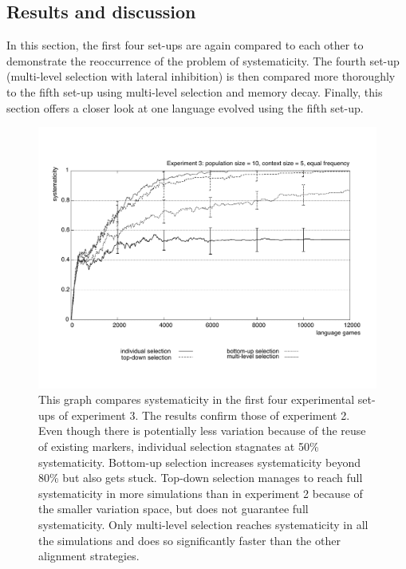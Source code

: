 \subsection{Results and discussion}

In this section, the first four set-ups are again compared to each other to demonstrate the reoccurrence of the problem of systematicity. The fourth set-up (multi-level selection with lateral inhibition) is then compared more thoroughly to the fifth set-up using multi-level selection and memory decay. Finally, this section offers a closer look at one language evolved using the fifth set-up.

\begin{figure}[t]
\centerline{\includegraphics[width=\textwidth]{Chapter4/figs/systematicity3}}
  \caption[Experiment 3: systematicity]{This graph compares systematicity in the first four experimental set-ups of experiment 3. The results confirm those of experiment 2. Even though there is potentially less variation because of the reuse of existing markers, individual selection stagnates at 50\% systematicity. Bottom-up selection increases systematicity beyond 80\% but also gets stuck. Top-down selection manages to reach full systematicity in more simulations than in experiment 2 because of the smaller variation space, but does not guarantee full systematicity. Only multi-level selection reaches systematicity in all the simulations and does so significantly faster than the other alignment strategies.}
   \label{f:systematicity3}
\end{figure}


